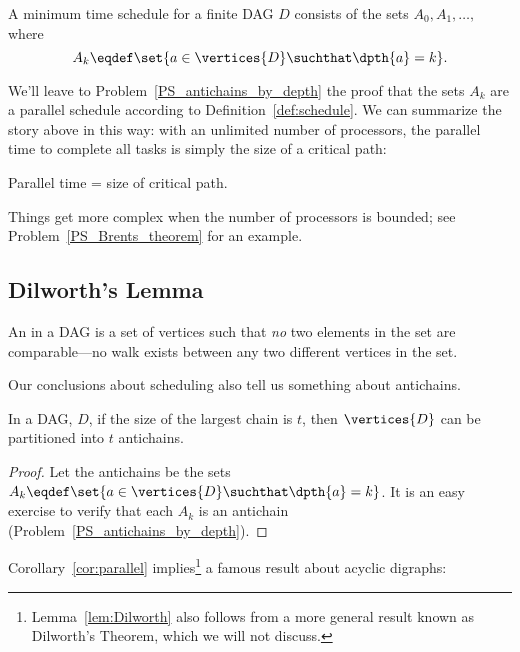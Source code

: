 \begin{theorem}\label{thm:parallel-time}
A minimum time schedule for a finite DAG $D$ consists of the sets
$A_0, A_1,\dots,$ where
\[
A_k \eqdef \set{a \in \vertices{D} \suchthat \dpth{a} =k}.
\]
\end{theorem}

We'll leave to Problem~\ref{PS_antichains_by_depth} the proof that the
sets $A_k$ are a parallel schedule according to
Definition~\ref{def:schedule}.  We can summarize the story above in
this way: with an unlimited number of processors, the parallel time to
complete all tasks is simply the size of a critical path:
\begin{corollary}\label{cor:critical-path-time}
Parallel time = size of critical path.
\end{corollary}

Things get more complex when the number of processors is bounded; see
Problem~\ref{PS_Brents_theorem} for an example.\iffalse But the
deductions we've made by assuming unlimited processors will still lead
us to useful conclusions.\fi

\subsection{Dilworth's Lemma}\label{dilworth_subsec}

\begin{definition}
An  in a DAG is a set of vertices such that \emph{no}
two elements in the set are comparable---no walk exists between any
two different vertices in the set.
\end{definition}

Our conclusions about scheduling also tell us something about antichains.

\begin{corollary}\label{cor:parallel}
In a DAG, $D$, if the size of the largest chain is $t$, then
$\vertices{D}$ can be partitioned into $t$ antichains.
\end{corollary}

\begin{proof}
Let the antichains be the sets $A_k \eqdef \set{a \in \vertices{D}
  \suchthat \dpth{a} =k}$.  It is an easy exercise to verify that each
$A_k$ is an antichain (Problem~\ref{PS_antichains_by_depth}).
\end{proof}

Corollary~\ref{cor:parallel} implies\footnote{Lemma~\ref{lem:Dilworth}
  also follows from a more general result known as Dilworth's Theorem,
  which we will not discuss.} a famous result about acyclic digraphs:

